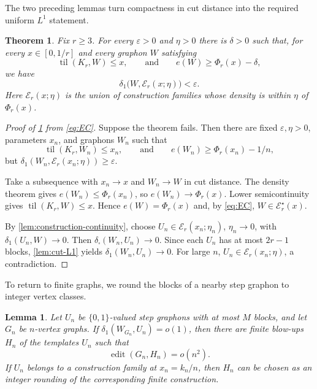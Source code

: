 \documentclass[10pt]{article}
\numberwithin{equation}{section}
\newtheorem{theorem}{Theorem}[section]
\newtheorem{lemma}[lemma]{Lemma}
\newcommand{\til}{\operatorname{til}}
\newcommand{\edit}{\operatorname{edit}}
\newcommand{\cE}{\mathcal E}
\newcommand{\eps}{\varepsilon}
\newcommand{\distone}{\delta_1}
\newcommand{\distsq}{\delta_\square}
\begin{document}
The two preceding lemmas turn compactness in cut distance into the required uniform $L^1$ statement.

\begin{theorem}\label{thm:uniform-graphon-stability}
Fix $r\ge3$.  For every $\eps>0$ and $\eta>0$ there is $\delta>0$ such that, for every $x\in[0,1/r]$ and every graphon $W$ satisfying
\[
 \til(K_r,W)\le x,
 \qquad\text{and}\qquad
 e(W)\ge \Phi_r(x)-\delta,
\]
we have
\[
 \distone\bigl(W,\cE_r(x;\eta)\bigr)<\eps.
\]
Here $\cE_r(x;\eta)$ is the union of construction families whose density is within $\eta$ of $\Phi_r(x)$.
\end{theorem}

\begin{proof}[Proof of \cref{thm:uniform-graphon-stability} from \cref{eq:EC}]
Suppose the theorem fails.  Then there are fixed $\eps,\eta>0$, parameters $x_n$, and graphons $W_n$ such that
\[
 \til(K_r,W_n)\le x_n,
 \qquad\text{and}\qquad
 e(W_n)\ge \Phi_r(x_n)-1/n,
\]
but $\distone(W_n,\cE_r(x_n;\eta))\ge\eps$.

Take a subsequence with $x_n\to x$ and $W_n\to W$ in cut distance.  The density theorem gives $e(W_n)\le \Phi_r(x_n)$, so $e(W_n)\to \Phi_r(x)$.  Lower semicontinuity gives $\til(K_r,W)\le x$.  Hence $e(W)=\Phi_r(x)$ and, by \cref{eq:EC}, $W\in\cE_r^\star(x)$.

By \cref{lem:construction-continuity}, choose $U_n\in\cE_r(x_n;\eta_n)$, $\eta_n\to0$, with $\distone(U_n,W)\to0$.  Then $\distsq(W_n,U_n)\to0$.  Since each $U_n$ has at most $2r-1$ blocks, \cref{lem:cut-L1} yields $\distone(W_n,U_n)\to0$.  For large $n$, $U_n\in\cE_r(x_n;\eta)$, a contradiction.
\end{proof}

To return to finite graphs, we round the blocks of a nearby step graphon to integer vertex classes.

\begin{lemma}\label{lem:rounding}
Let $U_n$ be $\{0,1\}$-valued step graphons with at most $M$ blocks, and let $G_n$ be $n$-vertex graphs.  If $\distone(W_{G_n},U_n)=o(1)$, then there are finite blow-ups $H_n$ of the templates $U_n$ such that
\[
 \edit(G_n,H_n)=o(n^2).
\]
If $U_n$ belongs to a construction family at $x_n=k_n/n$, then $H_n$ can be chosen as an integer rounding of the corresponding finite construction.
\end{lemma}
\end{document}
